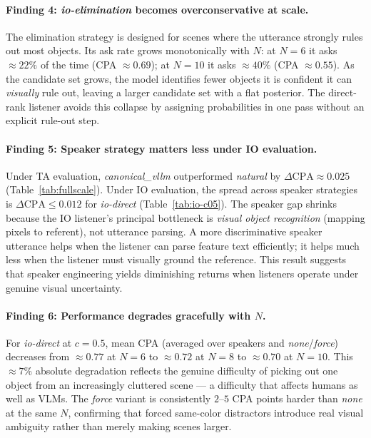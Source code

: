 \documentclass[11pt]{article}
\begin{document}
\paragraph{Finding 4: \textit{io-elimination} becomes overconservative at scale.}
The elimination strategy is designed for scenes where the utterance strongly
rules out most objects.  Its ask rate grows monotonically with $N$: at
$N{=}6$ it asks $\approx 22\%$ of the time (CPA $\approx 0.69$); at $N{=}10$
it asks $\approx 40\%$ (CPA $\approx 0.55$).
As the candidate set grows, the model identifies fewer objects it is
confident it can \emph{visually} rule out, leaving a larger candidate set
with a flat posterior.
The direct-rank listener avoids this collapse by assigning probabilities in
one pass without an explicit rule-out step.

\paragraph{Finding 5: Speaker strategy matters less under IO evaluation.}
Under TA evaluation, \textit{canonical\_vllm} outperformed \textit{natural} by
$\Delta\text{CPA} \approx 0.025$ (Table~\ref{tab:fullscale}).
Under IO evaluation, the spread across speaker strategies is
$\Delta\text{CPA} \leq 0.012$ for \textit{io-direct} (Table~\ref{tab:io-c05}).
The speaker gap shrinks because the IO listener's principal bottleneck is
\emph{visual object recognition} (mapping pixels to referent), not utterance
parsing.  A more discriminative speaker utterance helps when the listener
can parse feature text efficiently; it helps much less when the listener
must visually ground the reference.
This result suggests that speaker engineering yields diminishing returns when
listeners operate under genuine visual uncertainty.

\paragraph{Finding 6: Performance degrades gracefully with $N$.}
For \textit{io-direct} at $c{=}0.5$, mean CPA (averaged over speakers and
\textit{none}/\textit{force}) decreases from $\approx 0.77$ at $N{=}6$ to
$\approx 0.72$ at $N{=}8$ to $\approx 0.70$ at $N{=}10$.
This $\approx 7\%$ absolute degradation reflects the genuine difficulty of
picking out one object from an increasingly cluttered scene --- a difficulty
that affects humans as well as VLMs.
The \textit{force} variant is consistently $2$--$5$ CPA points harder than
\textit{none} at the same $N$, confirming that forced same-color distractors
introduce real visual ambiguity rather than merely making scenes larger.
\end{document}
